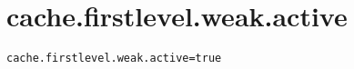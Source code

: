 \section{cache.firstlevel.weak.active}
\label{configuration:CacheFirstlevelWeakActive}
\ClearAPI
\TODO
{}
\begin{lstlisting}[style=Props,caption={Usage example for \textit{cache.firstlevel.weak.active}}]
cache.firstlevel.weak.active=true
\end{lstlisting}